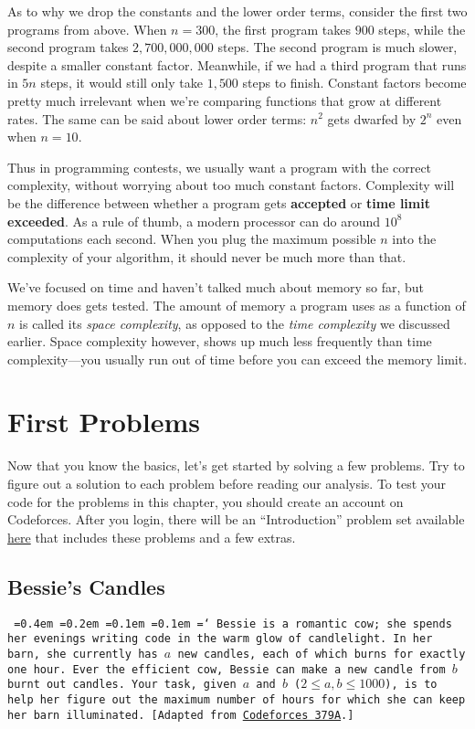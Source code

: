 As to why we drop the constants and the lower order terms, consider the first two programs from above. When $n=300$, the first program takes $900$ steps, while the second program takes $2,700,000,000$ steps. The second program is much slower, despite a smaller constant factor. Meanwhile, if we had a third program that runs in $5n$ steps, it would still only take $1,500$ steps to finish. Constant factors become pretty much irrelevant when we're comparing functions that grow at different rates. The same can be said about lower order terms: $n^2$ gets dwarfed by $2^n$ even when $n=10$.

Thus in programming contests, we usually want a program with the correct complexity, without worrying about too much constant factors. Complexity will be the difference between whether a program gets \textbf{\color{green}accepted} or \textbf{\color{red}time limit exceeded}. As a rule of thumb, a modern processor can do around $10^8$ computations each second. When you plug the maximum possible $n$ into the complexity of your algorithm, it should never be much more than that.

We've focused on time and haven't talked much about memory so far, but memory does gets tested. The amount of memory a program uses as a function of $n$ is called its \emph{space complexity}, as opposed to the \emph{time complexity} we discussed earlier. Space complexity however, shows up much less frequently than time complexity---you usually run out of time before you can exceed the memory limit.

\section{First Problems}

Now that you know the basics, let's get started by solving a few problems. Try to figure out a solution to each problem before reading our analysis. To test your code for the problems in this chapter, you should create an account on Codeforces. After you login, there will be an ``Introduction'' problem set available \href{http://codeforces.com/group/iMPx86rZXm/contests}{here} that includes these problems and a few extras.

\subsection{Bessie's Candles}

\texttt{
  \font=0.4em%
  \font=0.2em%
  \font=0.1em%
  \font=0.1em%
  \hyphenchar\font=`\-%
  Bessie is a romantic cow; she spends her evenings writing code in the warm glow of candlelight. In her barn, she currently has $a$ new candles, each of which burns for exactly one hour. Ever the efficient cow, Bessie can make a new candle from $b$ burnt out candles. Your task, given $a$ and $b$ ($2 \le a, b \le 1000$), is to help her figure out the maximum number of hours for which she can keep her barn illuminated. [Adapted from \href{http://codeforces.com/problemset/problem/379/A}{Codeforces 379A}.]
}

